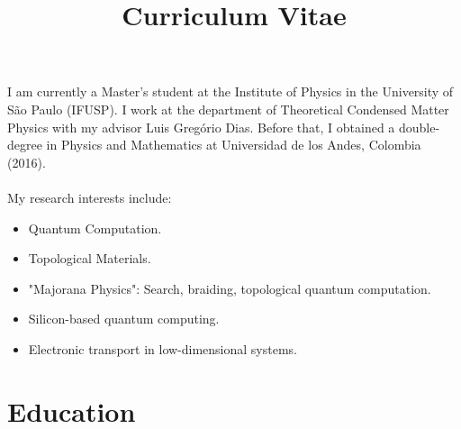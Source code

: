\documentclass[11pt,a4paper,sans]{moderncv} %
\title{Curriculum Vitae  }
\begin{document}
\makecvtitle %




I am currently a Master's student at the Institute of Physics in the University of S\~ao Paulo (IFUSP). I work at the department of Theoretical Condensed Matter Physics with my advisor Luis Greg\'orio Dias. Before that, I obtained a double-degree in Physics and Mathematics at Universidad de los Andes, Colombia (2016). \\ 
\\
My research interests include: 

\begin{itemize}
    \item Quantum Computation.
    \item Topological Materials.
    \item "Majorana Physics": Search, braiding, topological quantum computation.
    \item Silicon-based quantum computing.
    \item Electronic transport in low-dimensional systems.
\end{itemize}


\section{Education}




\end{document}

